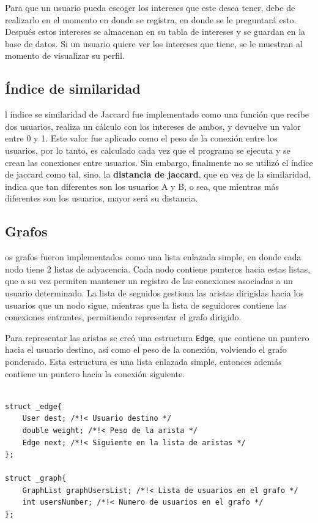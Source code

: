 \documentclass[9pt,letterpaper,onecolumn]{rho-class/rho}
\begin{document}
\vspace{0.5cm}
Para que un usuario pueda escoger los intereses que este desea tener, debe de realizarlo en el momento en donde se registra, en donde se le preguntará esto. Después estos intereses se almacenan en su tabla de intereses y se guardan en la base de datos. Si un usuario quiere ver los intereses que tiene, se le muestran al momento de visualizar su perfil.


\subsection{Índice de similaridad}
l índice se similaridad de Jaccard fue implementado como una función que recibe dos usuarios, realiza un cálculo con los intereses de ambos, y devuelve un valor entre 0 y 1. Este valor fue aplicado como el peso de la conexión entre los usuarios, por lo tanto, es calculado cada vez que el programa se ejecuta y se crean las conexiones entre usuarios. Sin embargo, finalmente no se utilizó el índice de jaccard como tal, sino, la \textbf{distancia de jaccard}, que en vez de la similaridad, indica que tan diferentes son los usuarios A y B, o sea, que mientras más diferentes son los usuarios, mayor será su distancia.

\subsection{Grafos}

os grafos fueron implementados como una lista enlazada simple, en donde cada nodo tiene 2 listas de adyacencia. Cada nodo contiene punteros hacia estas listas, que a su vez permiten mantener un registro de las conexiones asociadas a un usuario determinado. La lista de seguidos gestiona las aristas dirigidas hacia los usuarios que un nodo sigue, mientras que la lista de seguidores contiene las conexiones entrantes, permitiendo representar el grafo dirigido.

\vspace{0.5cm}

Para representar las aristas se creó una estructura \texttt{Edge}, que contiene un puntero hacia el usuario destino, así como el peso de la conexión, volviendo el grafo ponderado. Esta estructura es una lista enlazada simple, entonces además contiene un puntero hacia la conexión siguiente.

\begin{lstlisting}[caption={Estructura que representa una arista y un grafo}]

struct _edge{
    User dest; /*!< Usuario destino */
    double weight; /*!< Peso de la arista */
    Edge next; /*!< Siguiente en la lista de aristas */
};

struct _graph{
    GraphList graphUsersList; /*!< Lista de usuarios en el grafo */
    int usersNumber; /*!< Numero de usuarios en el grafo */
};
\end{lstlisting}
\end{document}
